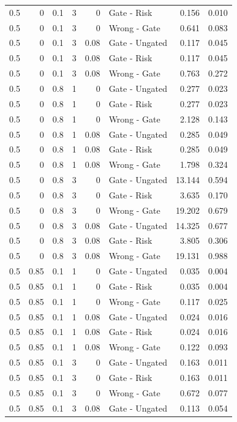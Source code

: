 \begin{longtable}{rrrrrlrr}
0.5 & 0 & 0.1 & 3 & 0 & Gate - Risk & 0.156 & 0.010\\
0.5 & 0 & 0.1 & 3 & 0 & Wrong - Gate & 0.641 & 0.083\\
0.5 & 0 & 0.1 & 3 & 0.08 & Gate - Ungated & 0.117 & 0.045\\
0.5 & 0 & 0.1 & 3 & 0.08 & Gate - Risk & 0.117 & 0.045\\
0.5 & 0 & 0.1 & 3 & 0.08 & Wrong - Gate & 0.763 & 0.272\\
0.5 & 0 & 0.8 & 1 & 0 & Gate - Ungated & 0.277 & 0.023\\
0.5 & 0 & 0.8 & 1 & 0 & Gate - Risk & 0.277 & 0.023\\
0.5 & 0 & 0.8 & 1 & 0 & Wrong - Gate & 2.128 & 0.143\\
0.5 & 0 & 0.8 & 1 & 0.08 & Gate - Ungated & 0.285 & 0.049\\
0.5 & 0 & 0.8 & 1 & 0.08 & Gate - Risk & 0.285 & 0.049\\
0.5 & 0 & 0.8 & 1 & 0.08 & Wrong - Gate & 1.798 & 0.324\\
0.5 & 0 & 0.8 & 3 & 0 & Gate - Ungated & 13.144 & 0.594\\
0.5 & 0 & 0.8 & 3 & 0 & Gate - Risk & 3.635 & 0.170\\
0.5 & 0 & 0.8 & 3 & 0 & Wrong - Gate & 19.202 & 0.679\\
0.5 & 0 & 0.8 & 3 & 0.08 & Gate - Ungated & 14.325 & 0.677\\
0.5 & 0 & 0.8 & 3 & 0.08 & Gate - Risk & 3.805 & 0.306\\
0.5 & 0 & 0.8 & 3 & 0.08 & Wrong - Gate & 19.131 & 0.988\\
0.5 & 0.85 & 0.1 & 1 & 0 & Gate - Ungated & 0.035 & 0.004\\
0.5 & 0.85 & 0.1 & 1 & 0 & Gate - Risk & 0.035 & 0.004\\
0.5 & 0.85 & 0.1 & 1 & 0 & Wrong - Gate & 0.117 & 0.025\\
0.5 & 0.85 & 0.1 & 1 & 0.08 & Gate - Ungated & 0.024 & 0.016\\
0.5 & 0.85 & 0.1 & 1 & 0.08 & Gate - Risk & 0.024 & 0.016\\
0.5 & 0.85 & 0.1 & 1 & 0.08 & Wrong - Gate & 0.122 & 0.093\\
0.5 & 0.85 & 0.1 & 3 & 0 & Gate - Ungated & 0.163 & 0.011\\
0.5 & 0.85 & 0.1 & 3 & 0 & Gate - Risk & 0.163 & 0.011\\
0.5 & 0.85 & 0.1 & 3 & 0 & Wrong - Gate & 0.672 & 0.077\\
0.5 & 0.85 & 0.1 & 3 & 0.08 & Gate - Ungated & 0.113 & 0.054\\

\end{longtable}
